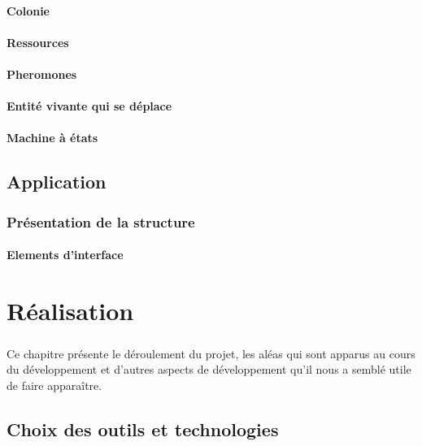 \documentclass{EPUProjetDi}
\begin{document}
\subsubsection{Colonie}

\subsubsection{Ressources}

\subsubsection{Pheromones}

\subsubsection{Entité vivante qui se déplace}

\subsubsection{Machine à états}

\section{Application}

\subsection{Présentation de la structure}

\subsubsection{Elements d'interface}

\chapter{Réalisation}

\paragraph{}
Ce chapitre présente le déroulement du projet, les aléas qui sont apparus au cours du 
développement et d'autres aspects de développement qu'il nous a semblé 
utile de faire apparaître.

\section{Choix des outils et technologies}
\end{document}
